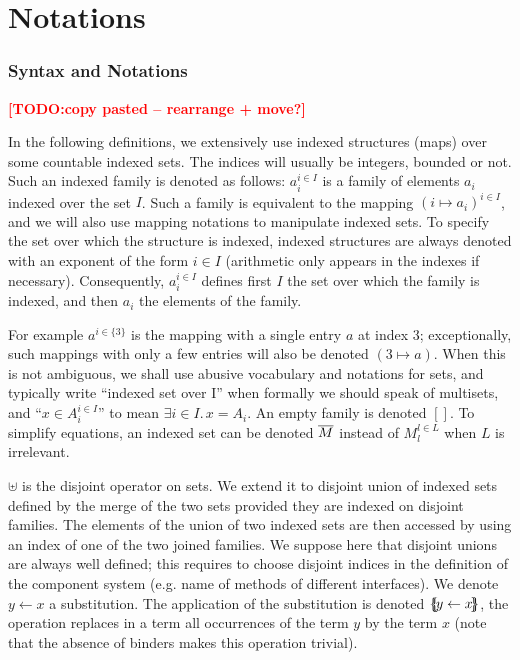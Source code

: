 \documentclass{lncs/llncs}
\newcommand{\TODO}[1]{\textcolor{red}{\textbf{[TODO:#1]}}}
\begin{document}
\section{Notations}

\subsubsection{Syntax and Notations}
\TODO{copy pasted -- rearrange + move?}

In the following definitions, we extensively use indexed structures
(maps) over some countable indexed sets. The indices will usually be
integers, bounded or not. Such an indexed family is denoted as
follows: $a_i^{i\in I}$ is a family of elements $a_i$ indexed over the
set $I$. Such a family
is equivalent to the mapping $(i\mapsto a_i)^{i\in I}$, and we will also use mapping 
notations to manipulate indexed sets.
To specify the set over which the structure is indexed, 
indexed structures are always denoted with an exponent of the form $i\in I$
(arithmetic only appears in the indexes if necessary).
Consequently, $a_i^{i\in I}$ defines first $I$ the set over which the
family is indexed, and then $a_i$ the elements of the family.

For example $a^{i\in\{3\}}$ is
the mapping with a single entry $a$ at index $3$; exceptionally, such mappings with
only a few entries will also be denoted $(3\mapsto a)$.
When this is not ambiguous, we shall use abusive vocabulary and
notations for sets, and typically write ``indexed set over I'' when  
formally we should speak of multisets, and ``$x\in
A_i^{i\in I}$'' to mean $\exists i\in I.\, x=A_i$.
An empty family is denoted $[]$. %
To simplify equations, an indexed set can be denoted $\overline{M}$
instead of $M_l^{l\in L}$ when $L$ is irrelevant.

$\uplus$ is the disjoint operator on sets. We extend it to  disjoint union  of indexed 
sets defined by the merge of the 
two sets provided they are indexed on disjoint families.
The elements
of the union of two indexed sets are then accessed by using an index of one of the two
joined families.
We suppose here that disjoint unions are always well defined; this
requires to choose disjoint  
indices in the definition of the component system (e.g. name of
methods of different interfaces).
We denote $y\gets x$ a substitution. The application of the substitution is denoted
$\{\hspace{-0.88ex}\{\!y\gets x\!\}\hspace{-0.87ex}\}$, the operation replaces in a term all occurrences 
of the term $y$ by the term $x$ (note that the absence of binders makes this operation 
trivial).
\end{document}
